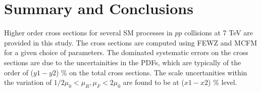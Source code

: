 \section{Summary and Conclusions}
\label{sec:conclusion}
Higher order cross sections for several SM processes in $pp$ collisions at 7 TeV are provided 
in this study. The cross sections are computed using FEWZ and MCFM for a given choice of parameters.
The dominated systematic errors on the cross sections are due to the uncertainities in the PDFs, which 
are typically of the order of ($y1-y2$) \% on the total cross sections. The scale uncertanities within 
the variation of $1/2 \mu_0 < \mu_R, \mu_F < 2\mu_0$ are found to be at ($x1-x2$) \% level. 
 
